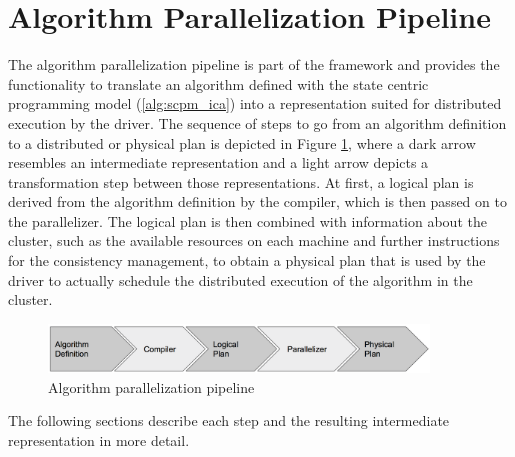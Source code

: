 \section{Algorithm Parallelization Pipeline}
\label{s:algo_parallel_pipeline}
The algorithm parallelization pipeline is part of the framework and provides the functionality to translate an algorithm defined with the state centric programming model (\ref{alg:scpm_ica}) into a representation suited for distributed execution by the driver.
The sequence of steps to go from an algorithm definition to a distributed or physical plan is depicted in Figure \ref{fig:parallel_pipeline}, where a dark arrow resembles an intermediate representation and a light arrow depicts a transformation step between those representations.
At first, a logical plan is derived from the algorithm definition by the compiler, which is then passed on to the parallelizer.
The logical plan is then combined with information about the cluster, such as the available resources on each machine and further instructions for the consistency management, to obtain a physical plan that is used by the driver to actually schedule the distributed execution of the algorithm in the cluster.
\begin{figure}[ht]
\centering
\includegraphics[width=0.9\textwidth]{img/algo_parallel_pipeline.png}
\caption{Algorithm parallelization pipeline}
\label{fig:parallel_pipeline}
\end{figure}
The following sections describe each step and the resulting intermediate representation in more detail.

